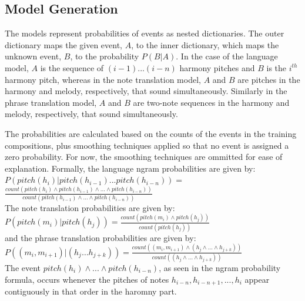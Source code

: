 \documentclass{sig-alternate}
\begin{document}
\subsection{Model Generation}
The models represent probabilities of events as nested dictionaries. The outer dictionary maps the given event, $A$, to the inner dictionary, which maps the unknown event, $B$, to the probability $P(B | A)$. In the case of the language model, $A$ is the sequence of $(i - 1) ... (i - n)$ harmony pitches and $B$ is the $i^{th}$ harmony pitch, whereas in the note translation model, $A$ and $B$  are pitches in the harmony and melody, respectively, that sound simultaneously. Similarly in the phrase translation model, $A$ and $B$ are two-note sequences in the harmony and melody, respectively, that sound simultaneously.

The probabilities are calculated based on the counts of the events in the training compositions, plus smoothing techniques applied so that no event is assigned a zero probability. For now, the smoothing techniques are ommitted for ease of explanation. Formally, the language ngram probabilities are given by: \\

$P(pitch(h_{i}) | pitch(h_{i - 1}) ... pitch(h_{i - n})) = $\\

$\frac{count(pitch(h_{i}) \wedge pitch(h_{i - 1}) \wedge ... \wedge pitch(h_{i - n}))}{count(pitch(h_{i - 1}) \wedge ... \wedge pitch(h_{i - n}))}$\\

The note translation probabilities are given by:\\

$P(pitch(m_{i}) | pitch(h_{j})) = \frac{count(pitch(m_{i}) \wedge pitch(h_{j}))}{count(pitch(h_{j}))}$\\

and the phrase translation probabilities are given by:\\

$P((m_{i}, m_{i+1}) | (h_{j} \ldots h_{j+k})) = \frac{count((m_{i}, m_{i+1}) \wedge (h_{j} \wedge \ldots \wedge h_{j+k}))}{count((h_{j} \wedge \ldots \wedge h_{j+k}))}$\\

The event $pitch(h_{i}) \wedge ... \wedge pitch(h_{i - n})$, as seen in the ngram probability formula, occurs whenever the pitches of notes $h_{i - n}, h_{i - n + 1}, ..., h_{i}$ appear contiguously in that order in the haromny part. 
\end{document}
